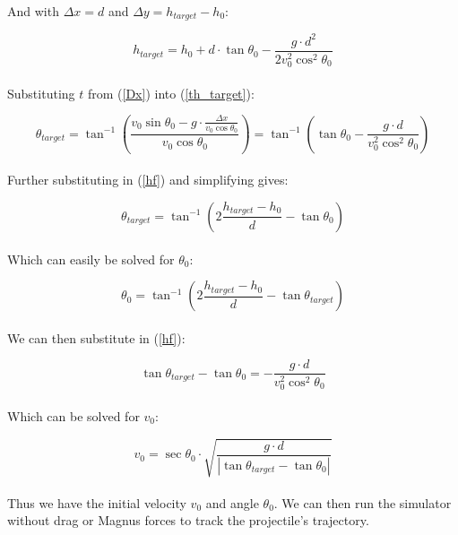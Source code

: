 \documentclass[a4paper]{article}
\begin{document}
	And with $ \Delta x = d $ and $ \Delta y = h_{target} - h_0 $:
	
	\begin{equation} \label{hf}
		h_{target} = h_0 + d \cdot \tan \theta_0 - \frac{g \cdot d^2}{2 v_0^2 \cos^2 \theta_0}
	\end{equation}\\
	
	Substituting $ t $ from (\ref{Dx}) into (\ref{th_target}):
	
	\begin{equation}
		\theta_{target} = \tan^{-1} \left( \frac{v_0 \sin \theta_0 - g \cdot \frac{\Delta x}{v_0 \cos \theta_0}}{v_0 \cos \theta_0} \right)
		 = \tan^{-1} \left( \tan \theta_0 - \frac{g \cdot d}{v_0^2 \cos^2 \theta_0} \right)
	\end{equation}\\
	
	Further substituting in (\ref{hf}) and simplifying gives:
	
	\begin{equation}
		\theta_{target} = \tan^{-1} \left( 2 \frac{h_{target} - h_0}{d} - \tan \theta_0 \right)
	\end{equation}\\
	
	Which can easily be solved for $ \theta_0 $:
	
	\begin{equation}
		\theta_0 = \tan^{-1} \left( 2 \frac{h_{target} - h_0}{d} - \tan \theta_{target} \right)
	\end{equation}\\
	
	We can then substitute in (\ref{hf}):
	
	\begin{equation}
		\tan \theta_{target} - \tan \theta_0 = - \frac{g \cdot d}{v_0^2 \cos^2 \theta_0}
	\end{equation}\\
	
	Which can be solved for $ v_0 $:
	
	\begin{equation}
		v_0 = \sec \theta_0 \cdot \sqrt{\frac{g \cdot d}{\left| \tan \theta_{target} - \tan \theta_0 \right|}}
	\end{equation}\\
	
	Thus we have the initial velocity $ v_0 $ and angle $ \theta_0 $. We can then run the simulator without drag or Magnus forces to track the projectile's trajectory.\\
	
\end{document}
